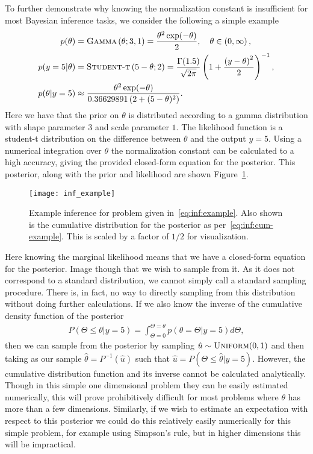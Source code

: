 To further demonstrate why knowing the normalization constant is insufficient
for most Bayesian inference tasks, we consider the following a simple example
\begin{subequations}
\label{eq:inf:example}
\begin{align}
p(\theta) &= \textsc{Gamma}\left(\theta; 3, 1\right) = \frac{\theta^2 \exp(-\theta)}{2},
 \quad \theta\in\left(0,\infty\right), \\
p(y=5|\theta) &= \textsc{Student-t}\left(5-\theta;2\right) = 
\frac{\Gamma (1.5)}{\sqrt{2\pi}}\left(1+\frac{\left(y-\theta\right)^2}{2}\right)^{-1}, \\
p(\theta |y=5) &\approx \frac{\theta^2
	 \exp(-\theta)}{0.36629891\left(2+(5-\theta)^2\right)} \label{eq:inf:example-post}.
\end{align}
\end{subequations}
Here we have that the prior on $\theta$ is distributed according to a gamma
distribution with shape parameter $3$ and scale parameter $1$.  The likelihood
function is a student-t distribution on the difference between $\theta$ and the
output $y=5$.  Using a numerical integration over $\theta$ the normalization
constant can be calculated to a high accuracy, giving the provided closed-form
equation for the posterior.  This posterior, along with the prior and likelihood are shown Figure~\ref{fig:inf:inf-example}.

\begin{figure}[t]
	\centering
	\texttt{[image: inf\_example]}
	\caption{Example inference for problem given
		in~\eqref{eq:inf:example}. Also shown is the cumulative distribution for
		the posterior as per~\eqref{eq:inf:cum-example}.  This is scaled by a factor
		of $1/2$ for visualization.  \label{fig:inf:inf-example}}
\end{figure}

Here knowing the marginal likelihood means that we have a 
closed-form equation for the posterior.  Image though that we 
wish to sample from it.  As it does not correspond to a standard distribution,
we cannot simply call a standard sampling procedure.  There is, in fact, no way
to directly sampling from this distribution without doing further calculations.  If
we also know the inverse of the cumulative density function of the posterior
\begin{align}
\label{eq:inf:cum-example}
P(\Theta\le\theta | y=5) = \int_{\Theta=0}^{\Theta=\theta}  p(\theta=\Theta | y=5) d\Theta,
\end{align}
then we can sample from the posterior by sampling $\hat{u} \sim \textsc{Uniform}(0,1)$ and
then taking as our sample $\hat{\theta} = P^{-1}(\hat{u})$ such that 
$\hat{u} = P(\Theta\le\hat{\theta} | y=5)$.  However, the cumulative distribution function
and its inverse cannot be calculated analytically.  Though in this simple one dimensional
problem they can be easily estimated numerically, this will prove prohibitively difficult
for most problems where $\theta$ has more than a few dimensions.  Similarly, if we
wish to estimate an expectation with respect to this posterior we could do this relatively
easily numerically for this simple problem, for example using Simpson's rule, but in higher
dimensions this will be impractical.

